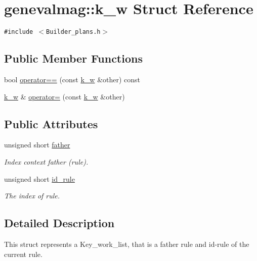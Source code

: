 \hypertarget{structgenevalmag_1_1k__w}{
\section{genevalmag::k\_\-w Struct Reference}
\label{structgenevalmag_1_1k__w}
}
{\tt \#include $<$Builder\_\-plans.h$>$}

\subsection*{Public Member Functions}
\begin{CompactItemize}
\item 
bool \hyperlink{structgenevalmag_1_1k__w_bfdaef873a635401975794595679a251}{operator==} (const \hyperlink{structgenevalmag_1_1k__w}{k\_\-w} \&other) const 
\item 
\hyperlink{structgenevalmag_1_1k__w}{k\_\-w} \& \hyperlink{structgenevalmag_1_1k__w_60b600d54504f37f1abb332481ae3886}{operator=} (const \hyperlink{structgenevalmag_1_1k__w}{k\_\-w} \&other)
\end{CompactItemize}
\subsection*{Public Attributes}
\begin{CompactItemize}
\item 
unsigned short \hyperlink{structgenevalmag_1_1k__w_ef2a6d852e6beedc2247a9fc62033313}{father}
\begin{CompactList}\small\item\em Index context father (rule). \item\end{CompactList}\item 
unsigned short \hyperlink{structgenevalmag_1_1k__w_b31e8aba428c97c3717c5860509eb3cc}{id\_\-rule}
\begin{CompactList}\small\item\em The index of rule. \item\end{CompactList}\end{CompactItemize}


\subsection{Detailed Description}
This struct represents a Key\_\-work\_\-list, that is a father rule and id-rule of the current rule. 

